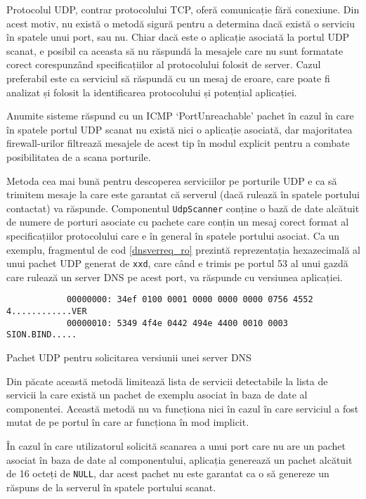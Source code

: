 	Protocolul UDP, contrar protocolului TCP, oferă comunicație fără conexiune. Din acest motiv, nu există o metodă sigură pentru a determina dacă există o serviciu în spatele unui port, sau nu. Chiar dacă este o aplicație asociată la portul UDP scanat, e posibil ca aceasta să nu răspundă la mesajele care nu sunt formatate corect corespunzând specificațiilor al protocolului folosit de server. Cazul preferabil este ca serviciul să răspundă cu un mesaj de eroare, care poate fi analizat și folosit la identificarea protocolului și potențial aplicației.
	
	Anumite sisteme răspund cu un ICMP `PortUnreachable' pachet în cazul în care în spatele portul UDP scanat nu există nici o aplicație asociată, dar majoritatea firewall-urilor filtrează mesajele de acest tip în modul explicit pentru a combate posibilitatea de a scana porturile.
	
	Metoda cea mai bună pentru descoperea serviciilor pe porturile UDP e ca să trimitem mesaje la care este garantat că serverul (dacă rulează în spatele portului contactat) va răspunde. Componentul \texttt{UdpScanner} conține o bază de date alcătuit de numere de porturi asociate cu pachete care conțin un mesaj corect format al specificațiilor protocolului care e în general în spatele portului asociat. Ca un exemplu, fragmentul de cod \ref{dnsverreq_ro} prezintă reprezentația hexazecimală al unui pachet UDP generat de \texttt{xxd}, care când e trimis pe portul 53 al unui gazdă care rulează un server DNS pe acest port, va răspunde cu versiunea aplicației.
	
	\begin{listing}[H]
		\begin{verbatim}
			00000000: 34ef 0100 0001 0000 0000 0000 0756 4552  4............VER
			00000010: 5349 4f4e 0442 494e 4400 0010 0003       SION.BIND.....
		\end{verbatim}
		\caption{Pachet UDP pentru solicitarea versiunii unei server DNS}
		\label{dnsverreq_ro}
	\end{listing}
	
	Din păcate această metodă limitează lista de servicii detectabile la lista de servicii la care există un pachet de exemplu asociat în baza de date al componentei. Această metodă nu va funcționa nici în cazul în care serviciul a fost mutat de pe portul în care ar funcționa în mod implicit.
	
	În cazul în care utilizatorul solicită scanarea a unui port care nu are un pachet asociat în baza de date al componentului, aplicația generează un pachet alcătuit de 16 octeți de \texttt{NULL}, dar acest pachet nu este garantat ca o să genereze un răspuns de la serverul în spatele portului scanat.
	

